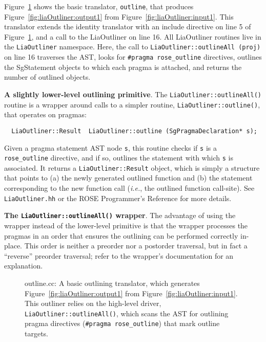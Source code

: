 Figure~\ref{fig:liaOutliner:basic} shows the basic translator,
\texttt{outline}, that produces Figure~\ref{fig:liaOutliner:output1}
from Figure~\ref{fig:liaOutliner:input1}. This translator extends the
identity translator with an include directive on line 5 of
Figure~\ref{fig:liaOutliner:basic}, and a call to the LiaOutliner on
line 16. All LiaOutliner routines live in the \texttt{LiaOutliner}
namespace. Here, the call to \texttt{LiaOutliner::outlineAll (proj)}
on line 16 traverses the AST, looks for \texttt{\#pragma
rose\_outline} directives, outlines the SgStatement objects to which
each pragma is attached, and returns the number of outlined objects.

\textbf{A slightly lower-level outlining primitive}. The
\texttt{LiaOutliner::outlineAll()} routine is a wrapper around calls
to a simpler routine, \texttt{LiaOutliner::outline()}, that operates
on pragmas:
%
\begin{lstlisting}
  LiaOutliner::Result  LiaOutliner::outline (SgPragmaDeclaration* s);
\end{lstlisting}
%
Given a pragma statement AST node \texttt{s}, this routine checks if
\texttt{s} is a \texttt{rose\_outline} directive, and if so, outlines
the statement with which \texttt{s} is associated. It returns a
\texttt{LiaOutliner::Result} object, which is simply a structure that
points to (a) the newly generated outlined function and (b) the
statement corresponding to the new function call (\emph{i.e.}, the
outlined function call-site). See \texttt{LiaOutliner.hh} or the ROSE
Programmer's Reference for more details.

\textbf{The \texttt{LiaOutliner::outlineAll()} wrapper}. The advantage
of using the wrapper instead of the lower-level primitive is that the
wrapper processes the pragmas in an order that ensures the outlining
can be performed correctly in-place. This order is neither a preorder
nor a postorder traversal, but in fact a ``reverse'' preorder
traversal; refer to the wrapper's documentation for an explanation.

\begin{figure}[!h]
{\indent
{\mySmallFontSize
\begin{latexonly}
   
\end{latexonly}
\begin{htmlonly}
   
\end{htmlonly}

}
}
\caption{outline.cc: A basic outlining translator, which generates
Figure~\ref{fig:liaOutliner:output1} from
Figure~\ref{fig:liaOutliner:input1}. This outliner relies on the
high-level driver, \texttt{LiaOutliner::outlineAll()}, which scans the
AST for outlining pragma directives (\texttt{\#pragma rose\_outline})
that mark outline targets.}
\label{fig:liaOutliner:basic}
\end{figure}

